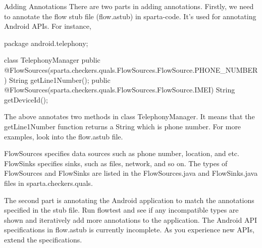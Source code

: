 Adding Annotations
There are two parts in adding annotations. 
Firstly, we need to annotate the flow stub file (flow.astub) in
sparta-code.
It's used for annotating Android APIs. For instance, 

package android.telephony;

class TelephonyManager {
    public @FlowSources(sparta.checkers.quals.FlowSources.FlowSource.PHONE_NUMBER) String getLine1Number();
    public @FlowSources(sparta.checkers.quals.FlowSources.FlowSource.IMEI) String getDeviceId();
}

The above annotates two methods in class TelephonyManager.
It means that the getLine1Number function returns a String which is
phone number.  For more examples, look into the flow.astub file.

FlowSources specifies data sources such as phone number, location, and
etc. FlowSinks specifies sinks, such as files, network, and so on.
The types of FlowSources and FlowSinks are listed in the
FlowSources.java and FlowSinks.java files in sparta.checkers.quals.


The second part is annotating the Android application to match
the annotations specified in the stub file. Run flowtest and see if
any incompatible types are shown and iteratively add more annotations
to the application.
The Android API specifications in flow.astub is currently
incomplete. As you experience new APIs, extend the specifications.
